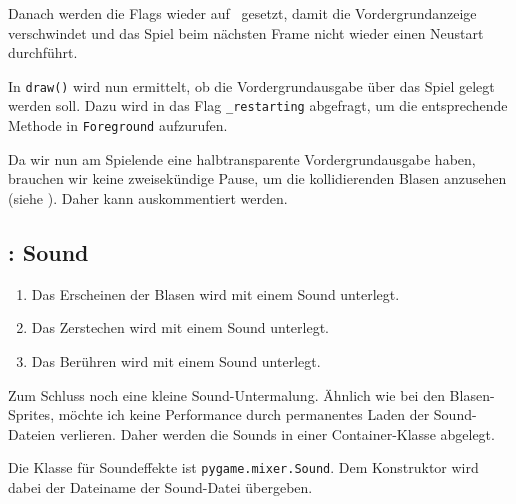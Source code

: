 Danach werden die Flags wieder auf \false\ gesetzt, damit die Vordergrundanzeige verschwindet und das Spiel beim nächsten Frame nicht wieder einen Neustart durchführt.


In \texttt{draw()} wird nun ermittelt, ob die Vordergrundausgabe über das Spiel gelegt werden soll. Dazu wird in  das Flag \texttt{\_restarting} abgefragt, um die entsprechende Methode in \texttt{Foreground} aufzurufen.


Da wir nun am Spielende eine halbtransparente Vordergrundausgabe haben, brauchen wir keine zweisekündige Pause, um die kollidierenden Blasen anzusehen (siehe ). Daher kann  auskommentiert werden.


\subsection{: Sound}
\begin{enumerate}
 \item Das Erscheinen der Blasen wird mit einem Sound unterlegt.\label{reqSoundErscheinen}
 \item Das Zerstechen wird mit einem Sound unterlegt.\label{reqSoundZerstechen}
 \item Das Berühren wird mit einem Sound unterlegt.\label{reqSoundBerühren}
\end{enumerate}
\er

Zum Schluss noch eine kleine Sound-Untermalung. Ähnlich wie bei den Blasen-Sprites, möchte ich keine Performance durch permanentes Laden der Sound-Dateien verlieren. Daher werden die Sounds in einer Container-Klasse abgelegt. 

Die Klasse für Soundeffekte ist \texttt{pygame.mixer.Sound}. Dem Konstruktor wird dabei der Dateiname der Sound-Datei übergeben.

